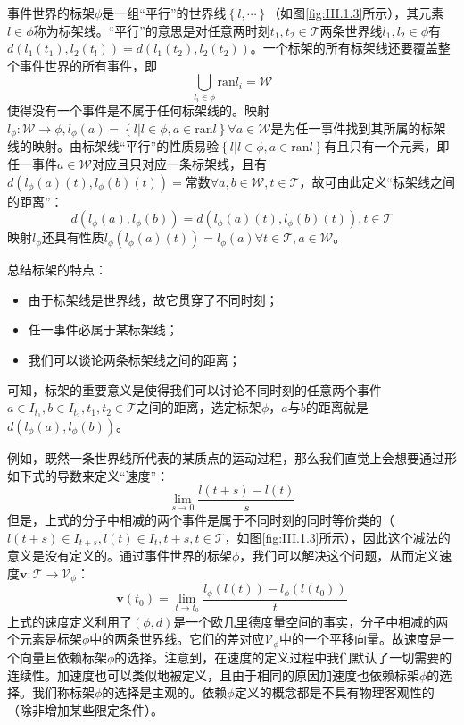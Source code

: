 \documentclass[main.tex]{subfiles}
\begin{document}
\begin{definition}[事件世界的标架]
事件世界的标架$\phi$是一组“平行”的世界线$\left\{l,\cdots\right\}$（如图\ref{fig:III.1.3}所示），其元素$l\in\phi$称为标架线。“平行”的意思是对任意两时刻$t_1,t_2\in\mathcal{T}$两条世界线$l_1,l_2\in\phi$有$d\left(l_1\left(t_1\right),l_2\left(t_!\right)\right)=d\left(l_1\left(t_2\right),l_2\left(t_2\right)\right)$。一个标架的所有标架线还要覆盖整个事件世界的所有事件，即
\[\bigcup_{l_i\in\phi}\mathrm{ran}l_i=\mathcal{W}\]
使得没有一个事件是不属于任何标架线的。映射$l_\phi:\mathcal{W}\rightarrow\phi,l_\phi\left(a\right)=\left\{l|l\in\phi,a\in\mathrm{ran}l\right\}\forall a\in\mathcal{W}$是为任一事件找到其所属的标架线的映射。由标架线“平行”的性质易验$\left\{l|l\in\phi,a\in\mathrm{ran}l\right\}$有且只有一个元素，即任一事件$a\in\mathcal{W}$对应且只对应一条标架线，且有$d\left(l_\phi\left(a\right)\left(t\right),l_\phi\left(b\right)\left(t\right)\right)=\text{常数}\forall a,b\in\mathcal{W},t\in\mathcal{T}$，故可由此定义“标架线之间的距离”：
\[d\left(l_\phi\left(a\right),l_\phi\left(b\right)\right)=d\left(l_\phi\left(a\right)\left(t\right),l_\phi\left(b\right)\left(t\right)\right),t\in\mathcal{T}\]
映射$l_\phi$还具有性质$l_\phi\left(l_\phi\left(a\right)\left(t\right)\right)=l_\phi\left(a\right)\forall t\in\mathcal{T},a\in\mathcal{W}$。
\end{definition}

总结标架的特点：
\begin{itemize}
    \item 由于标架线是世界线，故它贯穿了不同时刻；
    \item 任一事件必属于某标架线；
    \item 我们可以谈论两条标架线之间的距离；
\end{itemize}
可知，标架的重要意义是使得我们可以讨论不同时刻的任意两个事件$a\in I_{t_1},b\in I_{t_2},t_1,t_2\in\mathcal{T}$之间的距离，选定标架$\phi$，$a$与$b$的距离就是$d\left(l_\phi\left(a\right),l_\phi\left(b\right)\right)$。

例如，既然一条世界线所代表的某质点的运动过程，那么我们直觉上会想要通过形如下式的导数来定义“速度”：
\[
\lim_{s\to 0}\frac{l\left(t+s\right)-l\left(t\right)}{s}\]
但是，上式的分子中相减的两个事件是属于不同时刻的同时等价类的（$l\left(t+s\right)\in I_{t+s},l\left(t\right)\in I_t,t+s,t\in\mathcal{T}$，如图\ref{fig:III.1.3}所示），因此这个减法的意义是没有定义的。通过事件世界的标架$\phi$，我们可以解决这个问题，从而定义速度$\mathbf{v}:\mathcal{T}\rightarrow\mathcal{V}_\phi$：
\[\mathbf{v}\left(t_0\right)=\lim_{t\to t_0}\frac{l_\phi\left(l\left(t\right)\right)-l_\phi\left(l\left(t_0\right)\right)}{t}\]
上式的速度定义利用了$\left(\phi,d\right)$是一个欧几里德度量空间的事实，分子中相减的两个元素是标架$\phi$中的两条世界线。它们的差对应$\mathcal{V}_\phi$中的一个平移向量。故速度是一个向量且依赖标架$\phi$的选择。注意到，在速度的定义过程中我们默认了一切需要的连续性。加速度也可以类似地被定义，且由于相同的原因加速度也依赖标架$\phi$的选择。我们称标架$\phi$的选择是主观的。依赖$\phi$定义的概念都是不具有物理客观性的（除非增加某些限定条件）。
\end{document}
